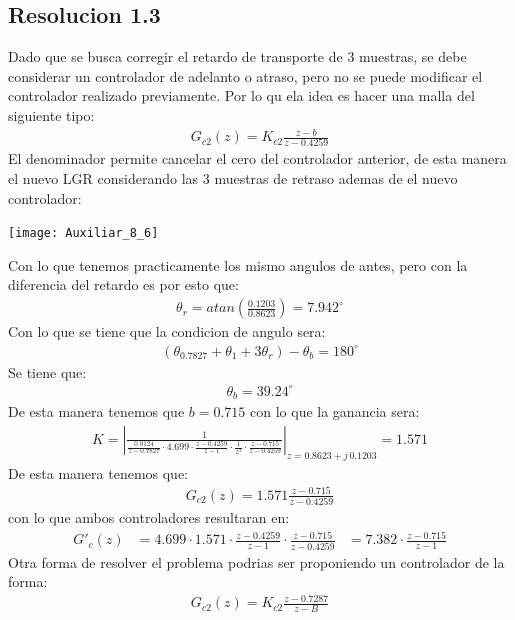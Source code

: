 \documentclass[
  11pt,
  letterpaper,
   addpoints,
  ]{exam}
\begin{document}
\begin{questions}
\begin{solution}
    \subsection*{Resolucion 1.3}
    Dado que se busca corregir el retardo de transporte de 3 muestras, se debe considerar un controlador de adelanto o atraso, pero no se puede modificar el controlador realizado previamente. Por lo qu ela idea es hacer una malla del siguiente tipo:
    \begin{align}
        G_{c2}(z) = K_{c2}\frac{z-b}{z-0.4259}
    \end{align}
    El denominador permite cancelar el cero del controlador anterior, de esta manera el nuevo LGR considerando las 3 muestras de retraso ademas de el nuevo controlador:
    \begin{center}
        \texttt{[image: Auxiliar\_8\_6]}
    \end{center}
    Con lo que tenemos practicamente los mismo angulos de antes, pero con la diferencia del retardo es por esto que:
    \begin{align}
        \theta_{r} = atan\left(\frac{0.1203}{0.8623}\right) = 7.942^{\circ}
    \end{align}
    Con lo que se tiene que la condicion de angulo sera:
    \begin{align}
        (\theta_{0.7827} + \theta_{1} + 3 \theta_{r}) - \theta_{b} = 180^{\circ}
    \end{align}
    Se tiene que:
    \begin{align}
        \theta_{b} = 39.24^{\circ}
    \end{align}
    De esta manera tenemos que $b = 0.715$ con lo que la ganancia sera:
    \begin{align}
        K = \left| \frac{1}{\frac{0.0124}{z-0.7827}\cdot 4.699 \cdot \frac{z-0.4259}{z-1} \cdot \frac{1}{z^{3}} \cdot \frac{z-0.715}{z-0.4259}}\right|_{z = 0.8623 + j \, 0.1203} = 1.571
    \end{align}
    De esta manera tenemos que:
    \begin{align}
        G_{c2}(z) = 1.571\frac{z-0.715}{z-0.4259}
    \end{align}
    con lo que ambos controladores resultaran en:
    \begin{align}
        G'_{c}(z) &= 4.699 \cdot 1.571 \cdot \frac{z-0.4259}{z-1} \cdot \frac{z-0.715}{z-0.4259}
        &= 7.382 \cdot \frac{z- 0.715}{z-1}
    \end{align}
    Otra forma de resolver el problema podrias ser proponiendo un controlador de la forma:
    \begin{align}
        G_{c2}(z) = K_{c2}\frac{z-0.7287}{z-B}
    \end{align}

\end{solution}
\end{questions}
\end{document}
